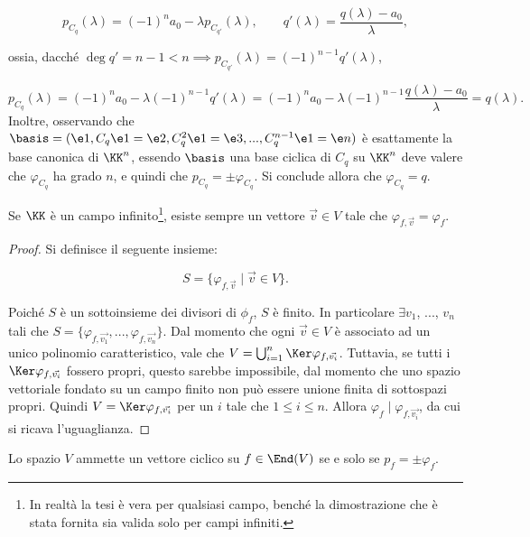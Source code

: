 \documentclass[11pt]{article}
\begin{document}
\begin{remark}
    \[ p_{C_q}(\lambda) = (-1)^n a_0 -\lambda p_{C_{q'}}(\lambda), \qquad q'(\lambda) = \frac{q(\lambda) - a_0}{\lambda}, \]
    
    ossia, dacché $\deg q' = n - 1 < n \implies p_{C_{q'}}(\lambda) = (-1)^{n-1} q'(\lambda)$,
    
    \[ p_{C_q}(\lambda) = (-1)^n a_0 - \lambda (-1)^{n-1} q'(\lambda) = (-1)^n a_0 - \lambda (-1)^{n-1} \frac{q(\lambda) - a_0}{\lambda} = q(\lambda). \]
    \li Inoltre, osservando che $\basis = (\e1, C_q \e1 = \e2, C_q^2 \e1 = \e3, ..., C_q^{n-1} \e1 = \e n)$ è esattamente
    la base canonica di $\KK^n$, essendo $\basis$ una base ciclica di $C_q$ su $\KK^n$ deve valere che $\varphi_{C_q}$
    ha grado $n$, e quindi che $p_{C_q} = \pm \varphi_{C_q}$. Si conclude allora che $\varphi_{C_q} = q$.
\end{remark}

\begin{proposition}
Se $\KK$ è un campo infinito\footnote{In realtà la tesi è vera per qualsiasi campo, benché la dimostrazione che è stata fornita sia valida solo per campi infiniti.}, esiste sempre un vettore $\vec{v} \in V$ tale che $\varphi_{f, \vec{v}} = \varphi_f$.
\end{proposition}

\begin{proof}
Si definisce il seguente insieme:

\[ S = \{ \varphi_{f, \vec{v}} \mid \vec{v} \in V \}. \]

\vskip 0.1in

Poiché $S$ è un sottoinsieme dei divisori di $\phi_f$, $S$ è finito.
In particolare $\exists v_1$, ..., $v_n$ tali che $S = \{ \varphi_{f, \vec{v_1}}, ..., \varphi_{f, \vec{v_n}} \}$. Dal momento
che ogni $\vec{v} \in V$ è associato
ad un unico polinomio caratteristico,
vale che $V = \bigcup_{i=1}^n \Ker \varphi_{f, \vec{v_i}}$. Tuttavia, se
tutti i $\Ker \varphi_{f, \vec{v_i}}$
fossero propri, questo sarebbe
impossibile, dal momento che uno spazio vettoriale fondato su un campo finito non può essere unione finita di sottospazi propri. Quindi $V = \Ker \varphi_{f, \vec{v_i}}$ per un $i$ tale che $1 \leq i \leq n$. Allora
$\varphi_f \mid \varphi_{f, \vec{v_i}}$, da cui si ricava
l'uguaglianza.
\end{proof}

\begin{theorem}
Lo spazio $V$ ammette un vettore ciclico su $f \in \End(V)$ se e
solo se $p_f = \pm \varphi_f$.
\end{theorem}
\end{document}
